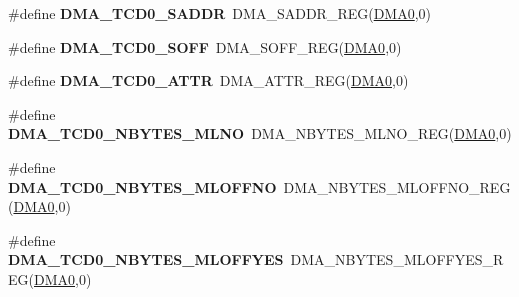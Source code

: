 \begin{DoxyCompactItemize}
\item 
\#define {\bfseries D\+M\+A\+\_\+\+T\+C\+D0\+\_\+\+S\+A\+D\+DR}~D\+M\+A\+\_\+\+S\+A\+D\+D\+R\+\_\+\+R\+EG(\hyperlink{group__DMA__Peripheral__Access__Layer_ga4103044f9ca209772f513dc694513ffb}{D\+M\+A0},0)\hypertarget{group__DMA__Register__Accessor__Macros_ga84c95bf7de504481d8a778c6210c2dff}{}\label{group__DMA__Register__Accessor__Macros_ga84c95bf7de504481d8a778c6210c2dff}

\item 
\#define {\bfseries D\+M\+A\+\_\+\+T\+C\+D0\+\_\+\+S\+O\+FF}~D\+M\+A\+\_\+\+S\+O\+F\+F\+\_\+\+R\+EG(\hyperlink{group__DMA__Peripheral__Access__Layer_ga4103044f9ca209772f513dc694513ffb}{D\+M\+A0},0)\hypertarget{group__DMA__Register__Accessor__Macros_ga6cd045ae026df1eef839ebe090004da8}{}\label{group__DMA__Register__Accessor__Macros_ga6cd045ae026df1eef839ebe090004da8}

\item 
\#define {\bfseries D\+M\+A\+\_\+\+T\+C\+D0\+\_\+\+A\+T\+TR}~D\+M\+A\+\_\+\+A\+T\+T\+R\+\_\+\+R\+EG(\hyperlink{group__DMA__Peripheral__Access__Layer_ga4103044f9ca209772f513dc694513ffb}{D\+M\+A0},0)\hypertarget{group__DMA__Register__Accessor__Macros_gacd0b2fdf139a36d75c53d4865c9110ab}{}\label{group__DMA__Register__Accessor__Macros_gacd0b2fdf139a36d75c53d4865c9110ab}

\item 
\#define {\bfseries D\+M\+A\+\_\+\+T\+C\+D0\+\_\+\+N\+B\+Y\+T\+E\+S\+\_\+\+M\+L\+NO}~D\+M\+A\+\_\+\+N\+B\+Y\+T\+E\+S\+\_\+\+M\+L\+N\+O\+\_\+\+R\+EG(\hyperlink{group__DMA__Peripheral__Access__Layer_ga4103044f9ca209772f513dc694513ffb}{D\+M\+A0},0)\hypertarget{group__DMA__Register__Accessor__Macros_ga6df3a3da857eb88f77c73070f6724e5b}{}\label{group__DMA__Register__Accessor__Macros_ga6df3a3da857eb88f77c73070f6724e5b}

\item 
\#define {\bfseries D\+M\+A\+\_\+\+T\+C\+D0\+\_\+\+N\+B\+Y\+T\+E\+S\+\_\+\+M\+L\+O\+F\+F\+NO}~D\+M\+A\+\_\+\+N\+B\+Y\+T\+E\+S\+\_\+\+M\+L\+O\+F\+F\+N\+O\+\_\+\+R\+EG(\hyperlink{group__DMA__Peripheral__Access__Layer_ga4103044f9ca209772f513dc694513ffb}{D\+M\+A0},0)\hypertarget{group__DMA__Register__Accessor__Macros_ga442f8530b6e3de8a52be316ad67f398a}{}\label{group__DMA__Register__Accessor__Macros_ga442f8530b6e3de8a52be316ad67f398a}

\item 
\#define {\bfseries D\+M\+A\+\_\+\+T\+C\+D0\+\_\+\+N\+B\+Y\+T\+E\+S\+\_\+\+M\+L\+O\+F\+F\+Y\+ES}~D\+M\+A\+\_\+\+N\+B\+Y\+T\+E\+S\+\_\+\+M\+L\+O\+F\+F\+Y\+E\+S\+\_\+\+R\+EG(\hyperlink{group__DMA__Peripheral__Access__Layer_ga4103044f9ca209772f513dc694513ffb}{D\+M\+A0},0)\hypertarget{group__DMA__Register__Accessor__Macros_gac8d4550b098b51609522217ce553a037}{}\label{group__DMA__Register__Accessor__Macros_gac8d4550b098b51609522217ce553a037}


\end{DoxyCompactItemize}
